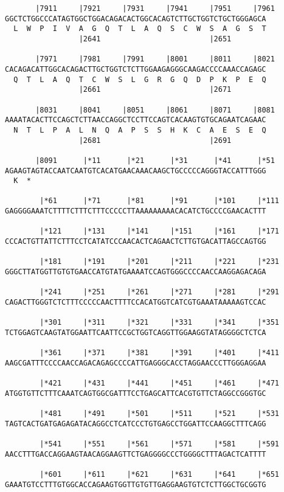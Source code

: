 \documentclass{article}
\begin{document}
\begin{Verbatim}
       |7911     |7921     |7931     |7941     |7951     |7961
GGCTCTGGCCCATAGTGGCTGGACAGACACTGGCACAGTCTTGCTGGTCTGCTGGGAGCA
  L  W  P  I  V  A  G  Q  T  L  A  Q  S  C  W  S  A  G  S  T
                 |2641                         |2651        
  
       |7971     |7981     |7991     |8001     |8011     |8021
CACAGACATTGGCACAGACTTGCTGGTCTCTTGGAAGAGGGCAAGACCCCAAACCAGAGC
  Q  T  L  A  Q  T  C  W  S  L  G  R  G  Q  D  P  K  P  E  Q
                 |2661                         |2671        
  
       |8031     |8041     |8051     |8061     |8071     |8081
AAAATACACTTCCAGCTCTTAACCAGGCTCCTTCCAGTCACAAGTGTGCAGAATCAGAAC
  N  T  L  P  A  L  N  Q  A  P  S  S  H  K  C  A  E  S  E  Q
                 |2681                         |2691        
  
       |8091      |*11      |*21      |*31      |*41      |*51
AGAAGTAGTACCAATCAATGTCACATGAACAAACAAGCTGCCCCCAGGGTACCATTTGGG
  K  *   
  
        |*61      |*71      |*81      |*91      |*101     |*111
GAGGGGAAATCTTTTCTTTCTTTCCCCCTTAAAAAAAAACACATCTGCCCCGAACACTTT
  
        |*121     |*131     |*141     |*151     |*161     |*171
CCCACTGTTATTCTTTCCTCATATCCCAACACTCAGAACTCTTGTGACATTAGCCAGTGG
  
        |*181     |*191     |*201     |*211     |*221     |*231
GGGCTTATGGTTGTGTGAACCATGTATGAAAATCCAGTGGGCCCCAACCAAGGAGACAGA
  
        |*241     |*251     |*261     |*271     |*281     |*291
CAGACTTGGGTCTCTTTCCCCCAACTTTTCCACATGGTCATCGTGAAATAAAAAGTCCAC
  
        |*301     |*311     |*321     |*331     |*341     |*351
TCTGGAGTCAAGTATGGAATTCAATTCCGCTGGTCAGGTTGGAAGGTATAGGGGCTCTCA
  
        |*361     |*371     |*381     |*391     |*401     |*411
AAGCGATTTCCCCAACCAGACAGAGCCCCATTGAGGGCACCTAGGAACCCTTGGGAGGAA
  
        |*421     |*431     |*441     |*451     |*461     |*471
ATGGTGTTCTTTCAAATCAGTGGCGATTTCCTGAGCATTCACGTGTTCTAGGCCGGGTGC
  
        |*481     |*491     |*501     |*511     |*521     |*531
TAGTCACTGATGAGAGATACAGGCCTCATCCCTGTGAGCCTGGATTCCAAGGCTTTCAGG
  
        |*541     |*551     |*561     |*571     |*581     |*591
AACCTTTGACCAGGAAGTAACAGGAAGTTCTGAGGGGCCCTGGGGCTTTAGACTCATTTT
  
        |*601     |*611     |*621     |*631     |*641     |*651
GAAATGTCCTTTGTGGCACCAGAAGTGGTTGTGTTGAGGAAGTGTCTCTTGGCTGCGGTG
  

\end{Verbatim}
\end{document}
